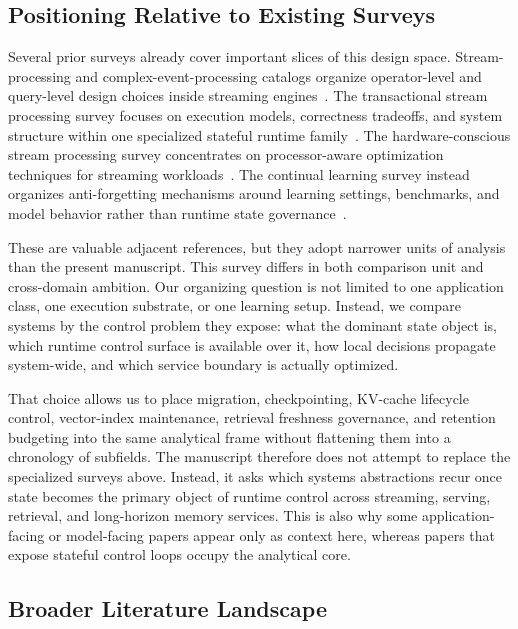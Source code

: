 \documentclass[acmsmall,screen,review]{acmart}
\begin{document}
\subsection{Positioning Relative to Existing Surveys}

Several prior surveys already cover important slices of this design space. Stream-processing and complex-event-processing catalogs organize operator-level and query-level design choices inside streaming engines~\cite{hirzel2014catalog,cugola2012processing}. The transactional stream processing survey focuses on execution models, correctness tradeoffs, and system structure within one specialized stateful runtime family~\cite{zhang2024survey}. The hardware-conscious stream processing survey concentrates on processor-aware optimization techniques for streaming workloads~\cite{zhang2020hardware}. The continual learning survey instead organizes anti-forgetting mechanisms around learning settings, benchmarks, and model behavior rather than runtime state governance~\cite{delange2021survey}.

These are valuable adjacent references, but they adopt narrower units of analysis than the present manuscript. This survey differs in both comparison unit and cross-domain ambition. Our organizing question is not limited to one application class, one execution substrate, or one learning setup. Instead, we compare systems by the control problem they expose: what the dominant state object is, which runtime control surface is available over it, how local decisions propagate system-wide, and which service boundary is actually optimized.

That choice allows us to place migration, checkpointing, KV-cache lifecycle control, vector-index maintenance, retrieval freshness governance, and retention budgeting into the same analytical frame without flattening them into a chronology of subfields. The manuscript therefore does not attempt to replace the specialized surveys above. Instead, it asks which systems abstractions recur once state becomes the primary object of runtime control across streaming, serving, retrieval, and long-horizon memory services. This is also why some application-facing or model-facing papers appear only as context here, whereas papers that expose stateful control loops occupy the analytical core.

\subsection{Broader Literature Landscape}
\end{document}
